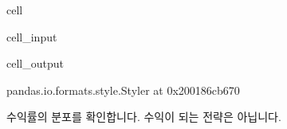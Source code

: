 \documentclass[letterpaper,10pt,english]{jupyterBook}
\begin{document}
\begin{sphinxuseclass}{cell}\begin{sphinxVerbatimInput}

\begin{sphinxuseclass}{cell_input}
\begin{sphinxVerbatim}[commandchars=\\\{\}]
\end{sphinxVerbatim}

\end{sphinxuseclass}\end{sphinxVerbatimInput}
\begin{sphinxVerbatimOutput}

\begin{sphinxuseclass}{cell_output}
\begin{sphinxVerbatim}[commandchars=\\\{\}]
\PYGZlt{}pandas.io.formats.style.Styler at 0x200186cb670\PYGZgt{}
\end{sphinxVerbatim}

\end{sphinxuseclass}\end{sphinxVerbatimOutput}

\end{sphinxuseclass}
\sphinxAtStartPar
 수익률의 분포를 확인합니다. 수익이 되는 전략은 아닙니다.
\end{document}
